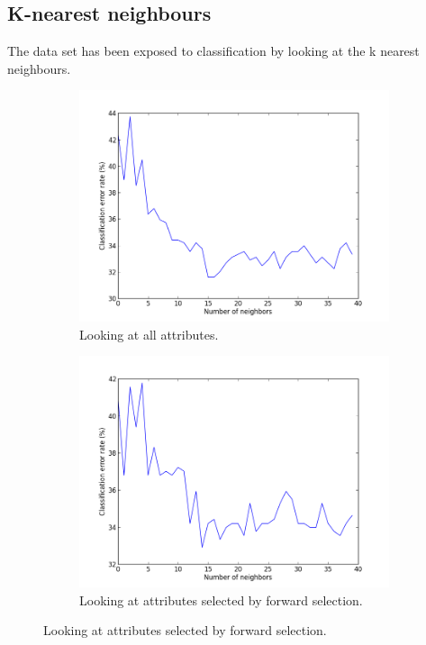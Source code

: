 \subsection{K-nearest neighbours}

The data set has been exposed to classification by looking at the k nearest neighbours.

\begin{figure}[H]
	\begin{subfigure}[b]{0.5\textwidth}
	\includegraphics[scale=0.3]{pictures/knnX.png}
	\caption{Looking at all attributes.}
	\label{knnResultX}
	\end{subfigure}
	\begin{subfigure}[b]{0.5\textwidth}
	\includegraphics[scale=0.3]{pictures/knnXAD.png}	
	\caption{Looking at attributes selected by forward selection.}
	\label{knnResultXad}
	\end{subfigure}


\end{figure}
